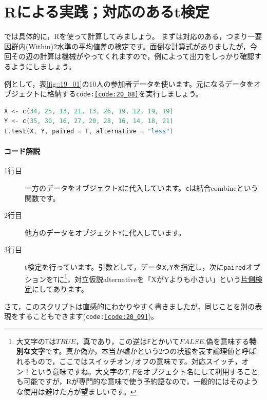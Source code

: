 \documentclass{ltjsbook}
\begin{document}
\section{Rによる実践；対応のあるt検定}
では具体的に，Rを使って計算してみましょう。
まずは対応のある，つまり一要因群内(Within)2水準の平均値差の検定です。面倒な計算式がありましたが，今回その辺の計算は機械がやってくれますので，例によって出力をしっかり確認するようにしましょう。

例として，表\ref{fig::19_01}の10人の参加者データを使います。元になるデータをオブジェクトに格納する\texttt{code:\ref{code:20_08}}を実行しましょう。
\begin{lstlisting}[language=c++,label={code:20_08},caption={t検定を行う}]
X <- c(34, 25, 13, 21, 13, 26, 19, 12, 19, 19)
Y <- c(35, 30, 16, 27, 20, 28, 16, 14, 18, 21)
t.test(X, Y, paired = T, alternative = "less")
\end{lstlisting}

\paragraph{コード解説}
\begin{description}
	\item[1行目] 一方のデータをオブジェクト\texttt{X}に代入しています。\texttt{c}は結合combineという関数です。
	\item[2行目] 他方のデータをオブジェクト\texttt{Y}に代入しています。
	\item[3行目] t検定を行っています。引数として，データ\texttt{X,Y}を指定し，次に\texttt{paired}オプションを\texttt{T}に\footnote{大文字の\texttt{T}は$TRUE$，真であり，この逆は\texttt{F}とかいて$FALSE$,偽を意味する\textbf{特別な文字}です。真か偽か，本当か嘘かという2つの状態を表す論理値と呼ばれるもので，ここではスイッチオン/オフの意味です。対応スイッチ，オン！という意味ですね。大文字の$T,F$をオブジェクト名にして利用することも可能ですが，Rが専門的な意味で使う予約語なので，一般的にはそのような使用は避けた方が望ましいです。}，対立仮説alternativeを「XがYよりも小さい」という\underline{片側検定}にしてあります。
\end{description}
さて，このスクリプトは直感的にわかりやすく書きましたが，同じことを別の表現をすることもできます(\texttt{code:\ref{code:20_09}})。
\end{document}
